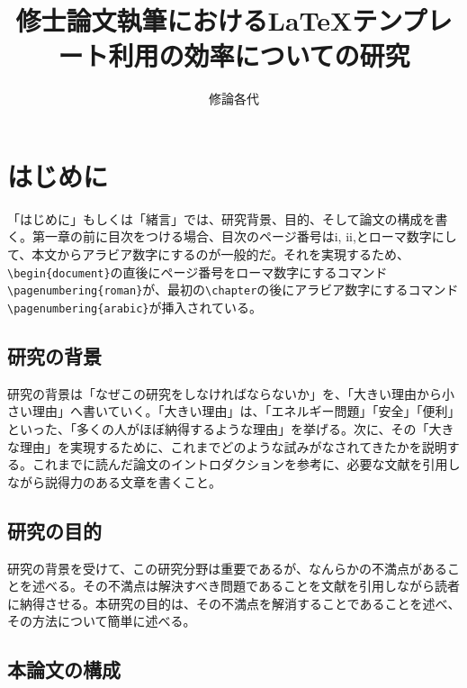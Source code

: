 \documentclass[titlepage]{jsreport}
\title{修士論文執筆におけるLaTeXテンプレート利用の効率についての研究}
\author{修論各代}
\begin{document}
\maketitle
{}

\setcounter{tocdepth}{2}
\tableofcontents
\pagestyle{plain}
\setcounter{page}{1}

\chapter{はじめに} \label{chap:introduction}

「はじめに」もしくは「緒言」では、研究背景、目的、そして論文の構成を書く。第一章の前に目次をつける場合、目次のページ番号はi, ii,とローマ数字にして、本文からアラビア数字にするのが一般的だ。それを実現するため、\verb|\begin{document}|の直後にページ番号をローマ数字にするコマンド\verb|\pagenumbering{roman}|が、最初の\verb|\chapter|の後にアラビア数字にするコマンド\verb|\pagenumbering{arabic}|が挿入されている。

\section{研究の背景}

研究の背景は「なぜこの研究をしなければならないか」を、「大きい理由から小さい理由」へ書いていく。「大きい理由」は、「エネルギー問題」「安全」「便利」といった、「多くの人がほぼ納得するような理由」を挙げる。次に、その「大きな理由」を実現するために、これまでどのような試みがなされてきたかを説明する。これまでに読んだ論文のイントロダクションを参考に、必要な文献を引用しながら説得力のある文章を書くこと。

\section{研究の目的}

研究の背景を受けて、この研究分野は重要であるが、なんらかの不満点があることを述べる。その不満点は解決すべき問題であることを文献を引用しながら読者に納得させる。本研究の目的は、その不満点を解消することであることを述べ、その方法について簡単に述べる。

\section{本論文の構成}
\end{document}
